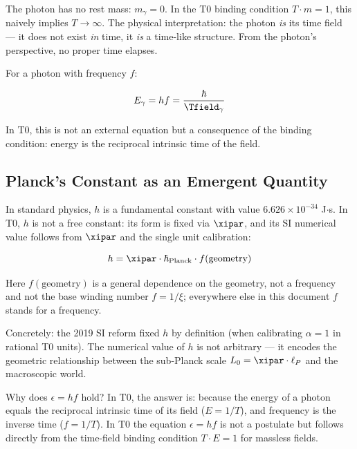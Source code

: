 The photon has no rest mass: $m_\gamma = 0$. In the T0 binding condition 
$T \cdot m = 1$, this naively implies $T \to \infty$. The physical interpretation: 
the photon \emph{is} its time field — it does not exist \emph{in} time, it 
\emph{is} a time-like structure. From the photon's perspective, no proper time elapses.

For a photon with frequency $f$:

\begin{equation}
    E_\gamma = hf = \frac{\hbar}{\Tfield_\gamma}
    \label{eq:photon_energy_t0}
\end{equation}

In T0, this is not an external equation but a consequence of the binding condition: 
energy is the reciprocal intrinsic time of the field.

\subsection{Planck's Constant as an Emergent Quantity}

In standard physics, $h$ is a fundamental constant with value 
$6.626 \times 10^{-34}$ J$\cdot$s. In T0, $h$ is not a free constant: 
its form is fixed via $\xipar$, and its SI numerical value follows from $\xipar$ and the 
single unit calibration:

\begin{equation}
    h = \xipar \cdot \hbar_{\text{Planck}} \cdot f(\text{geometry})
    \label{eq:h_from_xi}
\end{equation}

Here $f(\text{geometry})$ is a general dependence on the geometry, not a frequency and not the base winding number $f = 1/\xi$; everywhere else in this document $f$ stands for a frequency.

Concretely: the 2019 SI reform fixed $h$ by definition (when calibrating $\alpha = 1$ 
in rational T0 units). The numerical value of $h$ is not arbitrary — it encodes the 
geometric relationship between the sub-Planck scale $L_0 = \xipar \cdot \ell_P$ 
and the macroscopic world.

\begin{keyresult}
    Why does $\epsilon = hf$ hold? In T0, the answer is: because the energy of a 
    photon equals the reciprocal intrinsic time of its field ($E = 1/T$), and 
    frequency is the inverse time ($f = 1/T$). In T0 the equation $\epsilon = hf$ is not 
    a postulate but follows directly from the time-field binding condition 
    $T \cdot E = 1$ for massless fields.
\end{keyresult}

